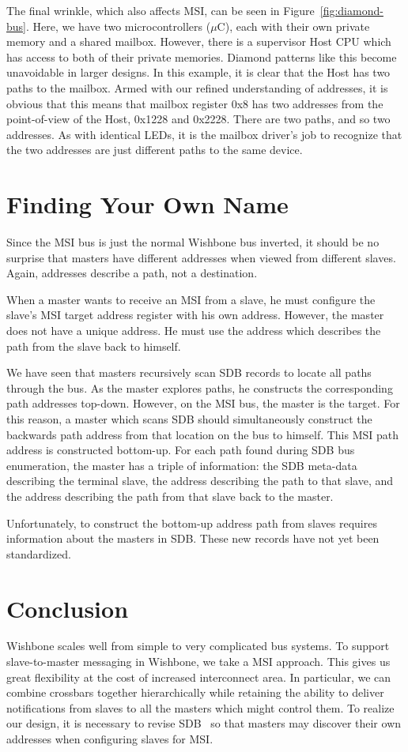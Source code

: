 \documentclass[a4paper]{jacow}
\begin{document}
The final wrinkle, which also affects MSI, can be seen in
Figure~\ref{fig:diamond-bus}.
Here, we have two microcontrollers ($\mu$C), each with their own private
memory and a shared mailbox.
However, there is a supervisor Host CPU which has access to both of their
private memories.
Diamond patterns like this become unavoidable in larger designs.
In this example, it is clear that the Host has two paths to the mailbox.
Armed with our refined understanding of addresses, 
it is obvious that this means that mailbox register 0x8 has two addresses
from the point-of-view of the Host, 0x1228 and 0x2228.
There are two paths, and so two addresses.
As with identical LEDs, it is the mailbox driver's job to recognize that the
two addresses are just different paths to the same device.

\section{Finding Your Own Name}

Since the MSI bus is just the normal Wishbone bus inverted,
it should be no surprise that masters have different addresses when
viewed from different slaves.
Again, addresses describe a path, not a destination.

When a master wants to receive an MSI from a slave, 
he must configure the slave's MSI target address register with his own address.
However, the master does not have a unique address.
He must use the address which describes the path from the slave back to himself.

We have seen that masters recursively scan SDB records to locate all paths
through the bus.
As the master explores paths, he constructs the corresponding path addresses top-down.
However, on the MSI bus, the master is the target.
For this reason, a master which scans SDB should simultaneously construct
the backwards path address from that location on the bus to himself.
This MSI path address is constructed bottom-up.
For each path found during SDB bus enumeration,
the master has a triple of information:
the SDB meta-data describing the terminal slave,
the address describing the path to that slave,
and the address describing the path from that slave back to the master.

Unfortunately,
to construct the bottom-up address path from slaves requires information
about the masters in SDB.
These new records have not yet been standardized.

\section{Conclusion}

Wishbone scales well from simple to very complicated bus systems.
To support slave-to-master messaging in Wishbone, we take a MSI approach.
This gives us great flexibility at the cost of increased interconnect area.
In particular, we can combine crossbars together hierarchically 
while retaining the ability to 
deliver notifications from slaves to all the masters which might control them.
To realize our design,
it is necessary to revise SDB~\cite{sdb} so that masters may
discover their own addresses when configuring slaves for MSI.



\end{document}
